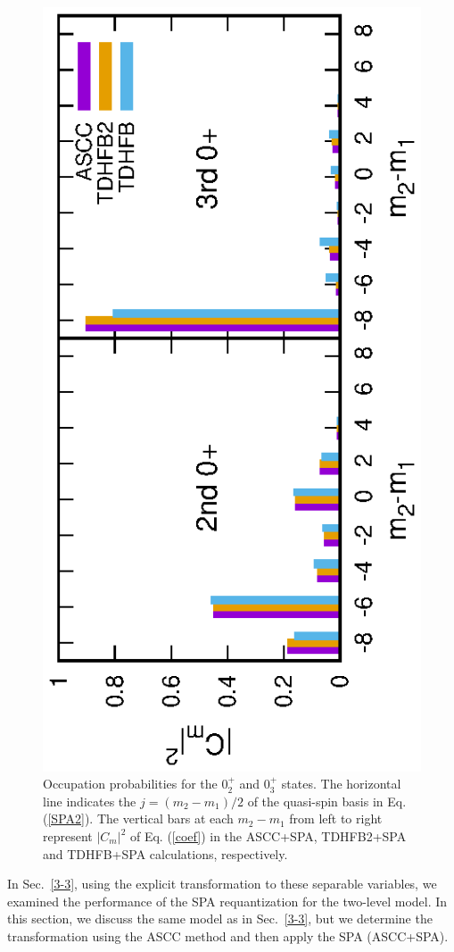 \documentclass[11pt]{book} %
\begin{document}
\begin{figure}[thb]
 \begin{center}
   \includegraphics[height=0.7\textwidth,angle=-90]{images/N16X3p2occ.eps}
 \end{center}
\caption{
Occupation probabilities for the $0_2^+$ and $0_3^+$ states.
The horizontal line indicates the $j=(m_2-m_1)/2$ of the quasi-spin basis
in Eq. (\ref{SPA2}).
The vertical bars at each $m_2-m_1$ from left to right
represent $|C_m|^2$ of Eq. (\ref{coef}) in
the ASCC+SPA, TDHFB2+SPA and TDHFB+SPA calculations,
respectively.
}
 \label{fig:N16_occ2}
\end{figure}

In Sec.~\ref{3-3}, using the explicit transformation to these
separable variables,
we examined the performance of the SPA requantization
for the two-level model.
In this section, we discuss the same model as in Sec.~\ref{3-3},
but we determine the transformation using the ASCC method and then apply the
SPA (ASCC+SPA).
\end{document}
